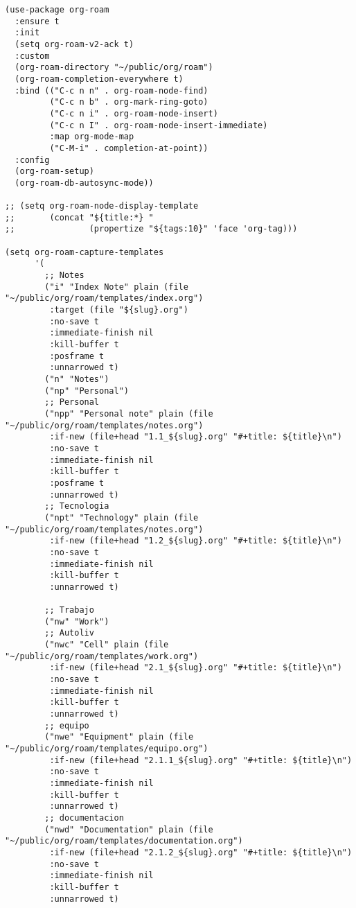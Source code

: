 \documentclass[11pt]{article}
\begin{document}
\begin{verbatim}
(use-package org-roam
  :ensure t
  :init
  (setq org-roam-v2-ack t)
  :custom
  (org-roam-directory "~/public/org/roam")
  (org-roam-completion-everywhere t)
  :bind (("C-c n n" . org-roam-node-find)
         ("C-c n b" . org-mark-ring-goto)
         ("C-c n i" . org-roam-node-insert)
         ("C-c n I" . org-roam-node-insert-immediate)
         :map org-mode-map
         ("C-M-i" . completion-at-point))
  :config
  (org-roam-setup)
  (org-roam-db-autosync-mode))

;; (setq org-roam-node-display-template
;;       (concat "${title:*} "
;;               (propertize "${tags:10}" 'face 'org-tag)))

(setq org-roam-capture-templates
      '(
        ;; Notes
        ("i" "Index Note" plain (file "~/public/org/roam/templates/index.org")
         :target (file "${slug}.org")
         :no-save t
         :immediate-finish nil
         :kill-buffer t
         :posframe t 
         :unnarrowed t)
        ("n" "Notes")
        ("np" "Personal")
        ;; Personal
        ("npp" "Personal note" plain (file "~/public/org/roam/templates/notes.org")
         :if-new (file+head "1.1_${slug}.org" "#+title: ${title}\n")
         :no-save t
         :immediate-finish nil
         :kill-buffer t
         :posframe t 
         :unnarrowed t)
        ;; Tecnologia
        ("npt" "Technology" plain (file "~/public/org/roam/templates/notes.org")
         :if-new (file+head "1.2_${slug}.org" "#+title: ${title}\n")
         :no-save t
         :immediate-finish nil
         :kill-buffer t
         :unnarrowed t)

        ;; Trabajo
        ("nw" "Work")
        ;; Autoliv
        ("nwc" "Cell" plain (file "~/public/org/roam/templates/work.org")
         :if-new (file+head "2.1_${slug}.org" "#+title: ${title}\n")
         :no-save t
         :immediate-finish nil
         :kill-buffer t
         :unnarrowed t)
        ;; equipo
        ("nwe" "Equipment" plain (file "~/public/org/roam/templates/equipo.org")
         :if-new (file+head "2.1.1_${slug}.org" "#+title: ${title}\n")
         :no-save t
         :immediate-finish nil
         :kill-buffer t
         :unnarrowed t)
        ;; documentacion
        ("nwd" "Documentation" plain (file "~/public/org/roam/templates/documentation.org")
         :if-new (file+head "2.1.2_${slug}.org" "#+title: ${title}\n")
         :no-save t
         :immediate-finish nil
         :kill-buffer t
         :unnarrowed t)


\end{verbatim}
\end{document}
